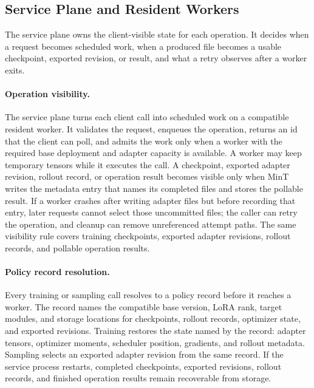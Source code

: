 \subsection{Service Plane and Resident Workers}

The service plane owns the client-visible state for each operation. It decides when a request becomes scheduled work, when a produced file becomes a usable checkpoint, exported revision, or result, and what a retry observes after a worker exits.

\paragraph{Operation visibility.}
The service plane turns each client call into scheduled work on a compatible resident worker. It validates the request, enqueues the operation, returns an id that the client can poll, and admits the work only when a worker with the required base deployment and adapter capacity is available. A worker may keep temporary tensors while it executes the call. A checkpoint, exported adapter revision, rollout record, or operation result becomes visible only when MinT writes the metadata entry that names its completed files and stores the pollable result. If a worker crashes after writing adapter files but before recording that entry, later requests cannot select those uncommitted files; the caller can retry the operation, and cleanup can remove unreferenced attempt paths. The same visibility rule covers training checkpoints, exported adapter revisions, rollout records, and pollable operation results.

\paragraph{Policy record resolution.}
Every training or sampling call resolves to a policy record before it reaches a worker. The record names the compatible base version, LoRA rank, target modules, and storage locations for checkpoints, rollout records, optimizer state, and exported revisions. Training restores the state named by the record: adapter tensors, optimizer moments, scheduler position, gradients, and rollout metadata. Sampling selects an exported adapter revision from the same record. If the service process restarts, completed checkpoints, exported revisions, rollout records, and finished operation results remain recoverable from storage.

